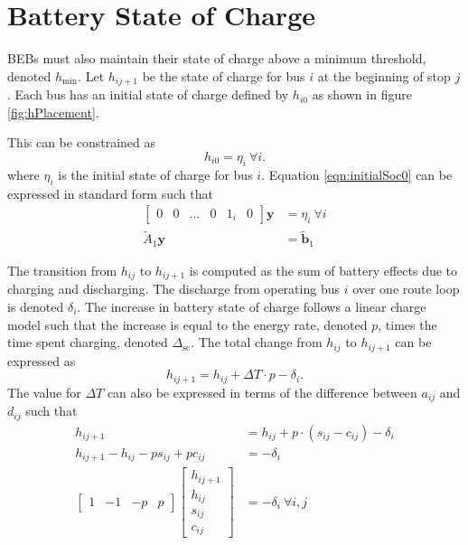 \section{Battery State of Charge\label{sec:5_battery}}
BEBs must also maintain their state of charge above a minimum threshold, denoted $h_{\text{min}}$. Let $h_{ij+1}$ be the state of charge for bus $i$ at the beginning of stop $j$. Each bus has an initial state of charge defined by $h_{i0}$ as shown in figure \ref{fig:hPlacement}. 

This can be constrained as
\begin{equation}\label{eqn:initialSoc0}
	h_{i0} = \eta_{i} \ \forall i.
\end{equation}
where $\eta_{i}$ is the initial state of charge for bus $i$.
Equation \ref{eqn:initialSoc0} can be expressed in standard form such that
\begin{equation} \begin{aligned}
	\begin{bmatrix}0 & 0 & \hdots & 0 & 1_i& 0 \end{bmatrix}\mathbf{y} &= \eta_i \ \forall i \\
		\tilde{A}_1\mathbf{y} &= \tilde{\mathbf{b}}_1
\end{aligned} \end{equation}

\par The transition from $h_{ij}$ to $h_{ij+1}$ is computed as the sum of battery effects due to charging and discharging. The discharge from operating bus $i$ over one route loop is denoted $\delta_i$. The increase in battery state of charge follows a linear charge model\cite{rong_coordinated_2016} such that the increase is equal to the energy rate, denoted $p$, times the time spent charging, denoted $\Delta_{\text{sc}}$.
The total change from $h_{ij}$ to $h_{ij+1}$ can be expressed as
\begin{equation}
	h_{ij+1} = h_{ij} + \Delta T\cdot p - \delta_i.
\end{equation}
The value for $\Delta T$ can also be expressed in terms of the difference between $a_{ij}$ and $d_{ij}$ such that
\begin{equation}\label{eqn:socDynamic1}\begin{aligned}
	h_{ij+1} &= h_{ij} + p\cdot \left ( s_{ij} - c_{ij} \right ) - \delta_i\\
	h_{ij+1} - h_{ij} - ps_{ij} + pc_{ij} &= -\delta_i\\
	\begin{bmatrix} 1 & -1 & -p & p\end{bmatrix} \begin{bmatrix}h_{ij+1} \\ h_{ij} \\ s_{ij} \\ c_{ij} \end{bmatrix} &= -\delta_i \ \forall i,j
\end{aligned}\end{equation}
